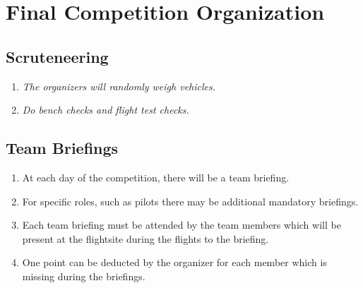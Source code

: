     \section{Final Competition Organization}

    \subsection{Scruteneering}
    \begin{enumerate}
      \item \emph{The organizers will randomly weigh vehicles.}
      \item \emph{Do bench checks and flight test checks.}
    \end{enumerate}

    \subsection{Team Briefings}
    \begin{enumerate}
      \item At each day of the competition, there will be a team briefing.
      \item For specific roles, such as pilots there may be additional mandatory briefings.
      \item Each team briefing must be attended by the team members which will be present at the flightsite during the flights to the briefing.
      \item One point can be deducted by the organizer for each member which is missing during the briefings.
    \end{enumerate}

